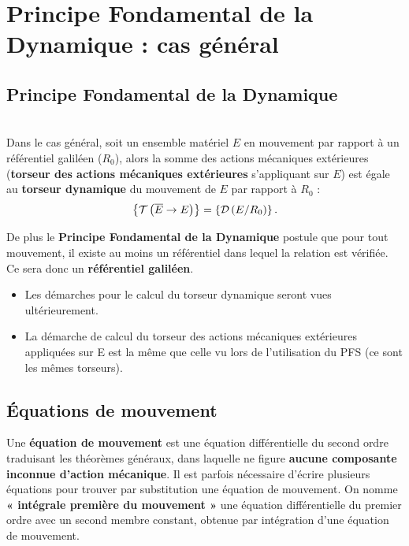 \documentclass[10pt,fleqn]{article} %
\begin{document}

\section[PFD : cas général]{Principe Fondamental de la Dynamique : cas général}

\subsection{Principe Fondamental de la Dynamique}

\begin{definition} ~\\
Dans le cas général, soit un ensemble matériel $E$ en mouvement par rapport à un référentiel galiléen ($R_0$), alors la somme des actions mécaniques extérieures (\textbf{torseur des actions mécaniques extérieures} s'appliquant sur $E$) est égale au \textbf{torseur dynamique} du mouvement de $E$ par rapport à $R_0$ :
$$
\left\{\mathcal{T} \left(\overline{E}\rightarrow E \right) \right\}=\left\{\mathcal{D} \left(E/R_0 \right) \right\}.
$$

De plus le \textbf{Principe Fondamental de la Dynamique} postule que pour tout mouvement, il existe au moins un référentiel dans lequel la relation est vérifiée. Ce sera donc un \textbf{référentiel galiléen}.

\end{definition}

\begin{rem}
\begin{itemize}
\item Les démarches pour le calcul du torseur dynamique seront vues ultérieurement.
\item La démarche de calcul du torseur des actions mécaniques extérieures appliquées sur E est la  même que celle vu lors de l'utilisation du PFS (ce sont les mêmes torseurs). 
\end{itemize}
\end{rem}

\subsection{Équations de mouvement}

\begin{definition}
Une \textbf{équation de mouvement} est une équation différentielle du second ordre traduisant les théorèmes généraux, dans laquelle ne figure \textbf{aucune composante inconnue d'action mécanique}. Il est parfois nécessaire d'écrire plusieurs équations pour trouver par substitution une équation de mouvement. On nomme \textbf{« intégrale première du mouvement »} une équation différentielle du premier ordre avec un second membre constant, obtenue par  intégration d'une équation de mouvement. 
\end{definition}
\end{document}
